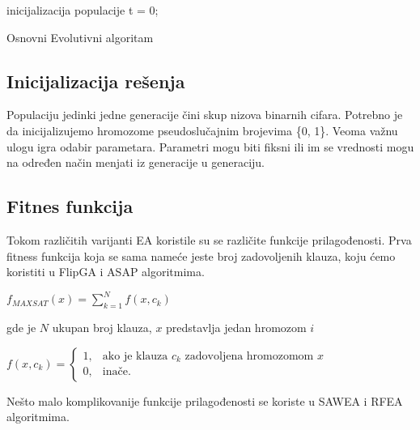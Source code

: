 \documentclass{article}
\begin{document}
\begin{algorithm}[H]
\SetAlgoLined
{}

\BlankLine
 inicijalizacija populacije\;
 t = 0; \\
\caption{Osnovni Evolutivni algoritam}
\end{algorithm}

\subsection{Inicijalizacija rešenja}
\label{sec:ea_init}
Populaciju jedinki jedne generacije čini skup nizova binarnih cifara.
Potrebno je da inicijalizujemo hromozome pseudoslučajnim brojevima \{0, 1\}. Veoma važnu ulogu igra odabir parametara.  Parametri mogu biti fiksni ili im se vrednosti mogu na određen način menjati iz generacije u generaciju.

\subsection{Fitnes funkcija}
\label{sec:ea_fitness}
Tokom različitih varijanti EA koristile su se različite funkcije prilagođenosti. Prva fitness funkcija koja se sama nameće jeste broj zadovoljenih klauza, koju ćemo koristiti u FlipGA i ASAP algoritmima.

	\begin{center}
	$ f_{MAXSAT} (x) = \sum_{k=1}^{N} f(x, c_k) $
	\end{center} 
	
gde je $N$ ukupan broj klauza, $x$ predstavlja jedan hromozom $i$

	\begin{center}
	$ f(x, c_k) = \begin{cases} 1, & \mbox{ako je klauza } c_k \mbox{ zadovoljena hromozomom } x \\ 0, & \mbox{inače.} \end{cases} $
	\end{center}
	
Nešto malo komplikovanije funkcije prilagođenosti se koriste u SAWEA i RFEA algoritmima.
\end{document}
